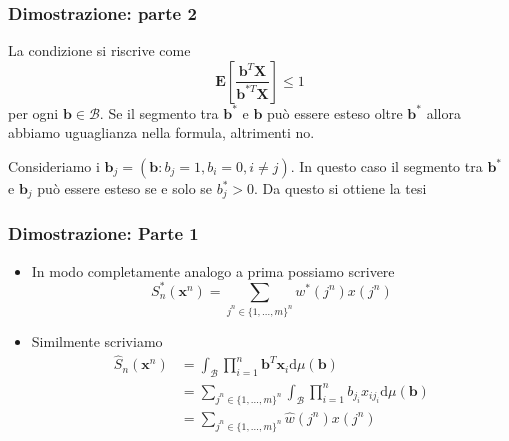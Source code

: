\documentclass{beamer}
\theoremstyle{plain}
\theoremstyle{definition}
\theoremstyle{remark}
\newcommand{\X}{\bm{X}}
\newcommand{\x}{\bm{x}}
\newcommand{\B}{\bm{b}}
\newcommand{\Sh}{\hat{S}}
\newcommand{\dmu}{\text{d}\mu(\B)}
\begin{document}
\begin{frame}
\frametitle{Dimostrazione: parte 2}
\begin{block}{}
La condizione si riscrive come
\begin{equation*}
\mathbf{E}\left[\frac{\B^T\X}{\B^{*T}\X}\right]\leq 1
\end{equation*}
per ogni $\B\in \mathcal{B}$.
Se il segmento tra $\B^*$ e $\B$ può essere esteso oltre $\B^*$ allora abbiamo uguaglianza nella formula, altrimenti no.
\end{block}
\begin{block}{}
Consideriamo i $\B_j = (\B:b_j = 1, b_i=0, i\neq j)$. In questo caso il segmento tra $\B^*$ e $\B_j$ può essere esteso se e solo se $b^*_j>0$. Da questo si ottiene la tesi
\end{block}
\hyperlink{KT}{}
\end{frame}

\begin{frame}[label=UnivInfdim]
\frametitle{Dimostrazione: Parte 1}
\begin{itemize}
	\item In modo completamente analogo a prima possiamo scrivere
	\begin{equation*}
	S_n^*(\x^n)=\sum_{j^n\in\{1,\ldots,m\}^n}{w^*(j^n)x(j^n)}
	\end{equation*}	
	\item Similmente scriviamo
	\begin{equation*}
	\begin{split}
	\Sh_n(\x^n) & = \int_\mathcal{B}{\prod_{i =1}^n{\B^T\x_i}\dmu}\\
	& = \sum_{j^n\in\{1,\ldots,m\}^n}{\int_\mathcal{B}{\prod_{i =1}^n{b_{j_i}x_{ij_i}}\dmu}}\\
	& = \sum_{j^n\in\{1,\ldots,m\}^n}{\hat{w}(j^n)x(j^n)}
	\end{split}                      
	\end{equation*}
\end{itemize}
\end{frame}
\end{document}
